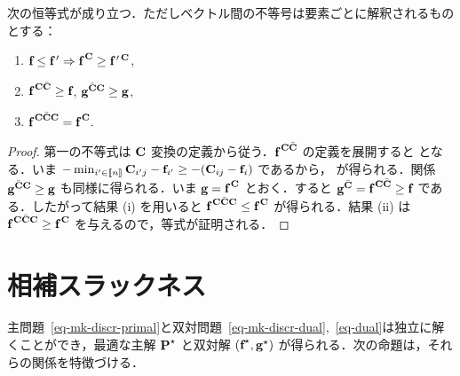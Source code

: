 \begin{prop}\label{prop-ccc-2}次の恒等式が成り立つ．ただしベクトル間の不等号は要素ごとに解釈されるものとする：
	\begin{enumerate}[label=(\roman*)]
	\item $\fD\leq \fD\,' \Rightarrow \fD^{\,\C}\geq \fD\,'^{\,\C}$,
	\item $\fD^{\,\C\bar{\C}} \geq \fD$, $\gD^{\bar{\C}\C} \geq \gD$,
	\item $\fD^{\,\C\bar{\C}\C}=\fD^{\,\C}.$
\end{enumerate}
\end{prop}
\begin{proof} 第一の不等式は $\C$ 変換の定義から従う．$\fD^{\,\C\bar{\C}}$ の定義を展開すると
となる．いま $-\min_{i'\in \range{n}} \C_{i'j}-\fD_{i'} \geq -(\C_{ij}-\fD_i)$ であるから，
が得られる．関係 $\gD^{\bar{\C}\C} \geq \gD$ も同様に得られる．いま $\gD=\fD^{\,\C}$ とおく．すると $\gD^{\bar{\C}}=\fD^{\,\C\bar{\C}}\geq \fD$ である．したがって結果 (i) を用いると $\fD^{\,\C\bar{\C}\C}\leq \fD^{\,\C}$ が得られる．結果 (ii) は $\fD^{\,\C\bar{\C}\C}\geq \fD^{\,\C}$ を与えるので，等式が証明される．
\end{proof}


\section{相補スラックネス}\label{s-complementary}

主問題~\eqref{eq-mk-discr-primal}と双対問題~\eqref{eq-mk-discr-dual},~\eqref{eq-dual}は独立に解くことができ，最適な主解 $\P^{\star}$ と双対解 $(\fD^{\star},\gD^{\star})$ が得られる．次の命題は，それらの関係を特徴づける．


